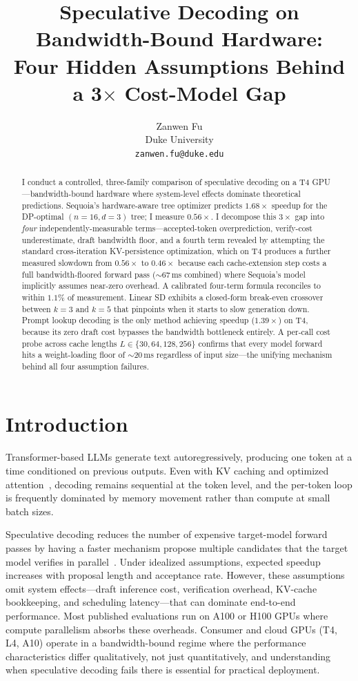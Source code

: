 \documentclass[letterpaper,twocolumn,10pt]{article}
\title{Speculative Decoding on Bandwidth-Bound Hardware:\\
Four Hidden Assumptions Behind a 3$\times$ Cost-Model Gap}
\author{
{\rm Zanwen Fu}\\
Duke University\\
\texttt{zanwen.fu@duke.edu}
}
\begin{document}
\maketitle

\begin{abstract}
I conduct a controlled, three-family comparison of speculative decoding on a T4 GPU---bandwidth-bound hardware where system-level effects dominate theoretical predictions.
Sequoia's hardware-aware tree optimizer predicts $1.68\times$ speedup for the DP-optimal $(n{=}16, d{=}3)$ tree; I measure $0.56\times$.
I decompose this $3\times$ gap into \emph{four} independently-measurable terms---accepted-token overprediction, verify-cost underestimate, draft bandwidth floor, and a fourth term revealed by attempting the standard cross-iteration KV-persistence optimization, which on T4 produces a further measured slowdown from $0.56\times$ to $0.46\times$ because each cache-extension step costs a full bandwidth-floored forward pass ($\sim$67\,ms combined) where Sequoia's model implicitly assumes near-zero overhead.
A calibrated four-term formula reconciles to within $1.1\%$ of measurement.
Linear SD exhibits a closed-form break-even crossover between $k{=}3$ and $k{=}5$ that pinpoints when it starts to slow generation down.
Prompt lookup decoding is the only method achieving speedup ($1.39\times$) on T4, because its zero draft cost bypasses the bandwidth bottleneck entirely.
A per-call cost probe across cache lengths $L \in \{30, 64, 128, 256\}$ confirms that every model forward hits a weight-loading floor of $\sim$20\,ms regardless of input size---the unifying mechanism behind all four assumption failures.
\end{abstract}

\section{Introduction}

Transformer-based LLMs generate text autoregressively, producing one token at a time conditioned on previous outputs.
Even with KV caching and optimized attention~\cite{flashattention}, decoding remains sequential at the token level, and the per-token loop is frequently dominated by memory movement rather than compute at small batch sizes.

Speculative decoding reduces the number of expensive target-model forward passes by having a faster mechanism propose multiple candidates that the target model verifies in parallel~\cite{leviathan2023speculative}.
Under idealized assumptions, expected speedup increases with proposal length and acceptance rate.
However, these assumptions omit system effects---draft inference cost, verification overhead, KV-cache bookkeeping, and scheduling latency---that can dominate end-to-end performance.
Most published evaluations run on A100 or H100 GPUs where compute parallelism absorbs these overheads.
Consumer and cloud GPUs (T4, L4, A10) operate in a bandwidth-bound regime where the performance characteristics differ qualitatively, not just quantitatively, and understanding when speculative decoding fails there is essential for practical deployment.
\end{document}
